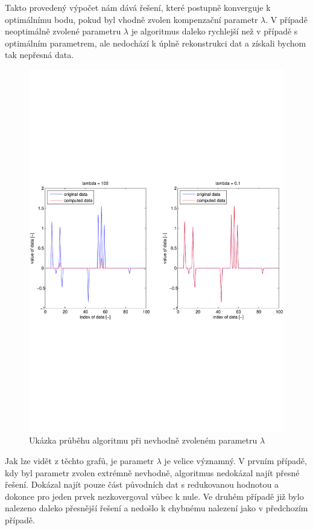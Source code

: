 \documentclass[FM,BP]{tulthesis}
\begin{document}
Takto provedený výpočet nám dává řešení, které postupně konverguje k optimálnímu bodu, pokud byl vhodně zvolen kompenzační parametr $\lambda$. V případě neoptimálně zvolené parametru $\lambda$ je algoritmus daleko rychlejší než v případě s optimálním parametrem, ale nedochází k úplně rekonstrukci dat a získali bychom tak nepřesná data.
\begin{figure}[!ht]
	\begin{center}
		\includegraphics[scale=0.70]{obr/lambda.pdf}
	\end{center}
	\caption{Ukázka průběhu algoritmu při nevhodně zvoleném parametru $\lambda$}
	\label{fig:basicLambda}
\end{figure}

Jak lze vidět z těchto grafů, je parametr $\lambda$ je velice významný. V prvním případě, kdy byl parametr zvolen extrémně nevhodně, algoritmus nedokázal najít přesné řešení. Dokázal najít pouze část původních dat s redukovanou hodnotou a dokonce pro jeden prvek nezkovergoval vůbec k nule. Ve druhém případě již bylo nalezeno daleko přesnější řešení a nedošlo k chybnému nalezení jako v předchozím případě.
\end{document}
